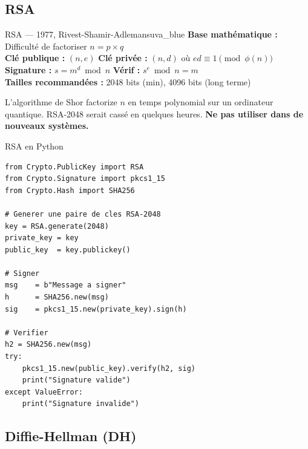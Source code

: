 \documentclass[12pt, a4paper]{article}
\begin{document}
\subsection{RSA}

\begin{algobox}{RSA --- 1977, Rivest-Shamir-Adleman}{suva_blue}
\textbf{Base mathématique :} Difficulté de factoriser $n = p \times q$\\
\textbf{Clé publique :} $(n, e)$ \quad \textbf{Clé privée :} $(n, d)$ où $ed \equiv 1 \pmod{\phi(n)}$\\
\textbf{Signature :} $s = m^d \bmod n$ \quad \textbf{Vérif :} $s^e \bmod n = m$\\
\textbf{Tailles recommandées :} 2048 bits (min), 4096 bits (long terme)
\end{algobox}

\begin{danger}
L'algorithme de Shor factorize $n$ en temps polynomial sur un ordinateur quantique.
RSA-2048 serait cassé en quelques heures. \textbf{Ne pas utiliser dans de nouveaux systèmes.}
\end{danger}

\begin{pratique}{RSA en Python}
\begin{lstlisting}[style=python]
from Crypto.PublicKey import RSA
from Crypto.Signature import pkcs1_15
from Crypto.Hash import SHA256

# Generer une paire de cles RSA-2048
key = RSA.generate(2048)
private_key = key
public_key  = key.publickey()

# Signer
msg    = b"Message a signer"
h      = SHA256.new(msg)
sig    = pkcs1_15.new(private_key).sign(h)

# Verifier
h2 = SHA256.new(msg)
try:
    pkcs1_15.new(public_key).verify(h2, sig)
    print("Signature valide")
except ValueError:
    print("Signature invalide")
\end{lstlisting}
\end{pratique}

\subsection{Diffie-Hellman (DH)}
\end{document}
